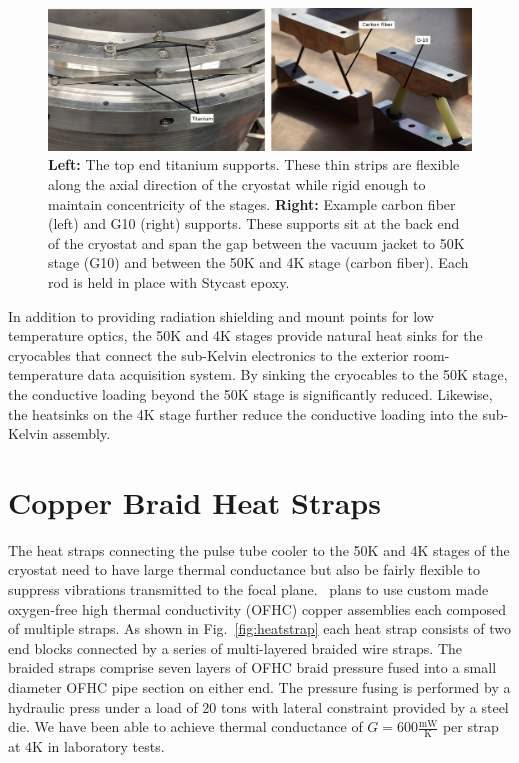 \documentclass[]{spie}
\begin{document}
\begin{figure}[b]
	\center
	\includegraphics{supports.png}
	\caption{\textbf{Left:} The top end titanium supports. These thin strips
	are flexible along the axial direction of the cryostat while rigid enough
	to maintain concentricity of the stages. \textbf{Right:} Example carbon fiber (left) and G10 (right) supports. These
	supports sit at the back end of the cryostat and span the gap between the
	vacuum jacket to 50K stage (G10) and between the 50K and 4K stage (carbon
	fiber). Each rod is held in place with Stycast epoxy.}
	\label{fig:supports}
\end{figure}



In addition to providing radiation shielding and mount points for low
temperature optics, the 50K and 4K stages provide natural heat sinks for the
cryocables that connect the sub-Kelvin electronics to the exterior
room-temperature data acquisition system. By sinking the cryocables to the 50K
stage, the conductive loading beyond the 50K stage is significantly reduced.
Likewise, the heatsinks on the 4K stage further reduce the conductive
loading into the sub-Kelvin assembly.



\section{Copper Braid Heat Straps}

The heat straps connecting the pulse tube cooler to the 50K and 4K stages of
the cryostat need to have large thermal conductance but also be fairly
flexible to suppress vibrations transmitted to the focal plane. \biceparray\ 
plans to use custom made oxygen-free high thermal conductivity (OFHC) copper
assemblies each composed of multiple straps. As shown
in Fig.~\ref{fig:heatstrap} each heat strap consists of two end blocks
connected by a series of multi-layered braided wire straps. The braided straps
comprise seven layers of OFHC braid pressure fused into a small diameter OFHC
pipe section on either end. The pressure fusing is performed by a hydraulic
press under a load of 20 tons with lateral constraint provided by a steel
die. We have been able to achieve thermal conductance of $G=600
\frac{\text{mW}}{\text{K}}$ per strap at $4$K in laboratory tests.
\end{document}
